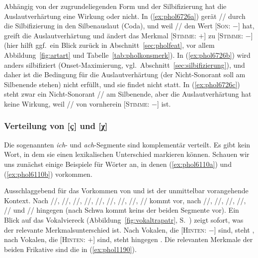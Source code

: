 Abhängig von der zugrundeliegenden Form und der Silbifizierung hat die Auslautverhärtung eine Wirkung oder nicht.
In (\ref{ex:phol6726a}) gerät // durch die Silbifizierung in den Silbenauslaut (Coda), und weil // den Wert [\textsc{Son}: $-$] hat, greift die Auslautverhärtung und ändert das Merkmal [\textsc{Stimme}: $+$] zu [\textsc{Stimme}: $-$] (hier hilft ggf.\ ein Blick zurück in Abschnitt~\ref{sec:pholfeat}, vor allem Abbildung~\ref{fig:artart} und Tabelle~\ref{tab:pholkonsmerk}).
In (\ref{ex:phol6726b}) wird anders silbifiziert (Onset-Maximierung, vgl.\ Abschnitt~\ref{sec:silbifizierung}), und daher ist die Bedingung für die Auslautverhärtung (der Nicht-Sonorant soll am Silbenende stehen) nicht erfüllt, und sie findet nicht statt.
In (\ref{ex:phol6726c}) steht zwar ein Nicht-Sonorant // am Silbenende, aber die Auslautverhärtung hat keine Wirkung, weil // von vornherein [\textsc{Stimme}: $-$] ist.

\subsubsection{Verteilung von [ç] und [χ]}

\label{sec:prozichach}

Die sogenannten \textit{ich}- und \textit{ach}-Segmente sind komplementär verteilt.
Es gibt kein Wort, in dem sie einen lexikalischen Unterschied markieren können.
Schauen wir uns zunächst einige Beispiele für Wörter an, in denen \textipa{[\c{c}]} (\ref{ex:phol6110a}) und \textipa{[X]} (\ref{ex:phol6110b}) vorkommen.

\begin{exe}
  \ex\label{ex:phol6110}
  \begin{xlist}
  \end{xlist}
\end{exe}

Ausschlaggebend für das Vorkommen von \textipa{[\c{c}]} und \textipa{[X]} ist der unmittelbar vorangehende Kontext.
Nach //, //, //, //, //, /\textipa{\o}/, //, //, /\textipa{\oe}/ kommt \textipa{[\c{c}]} vor, nach //, //, //, //, // und // hingegen \textipa{[X]} (nach Schwa kommt keins der beiden Segmente vor).
Ein Blick auf das Vokalviereck (Abbildung~\ref{fig:vokaltrapatr}, S.~\pageref{fig:vokaltrapatr}) zeigt sofort, was der relevante Merkmalsunterschied ist.
Nach Vokalen, die [\textsc{Hinten}: $-$] sind, steht \textipa{[\c{c}]}, nach Vokalen, die [\textsc{Hinten}: $+$] sind, steht hingegen \textipa{[X]}.
Die relevanten Merkmale der beiden Frikative sind die in (\ref{ex:phol1190}).

